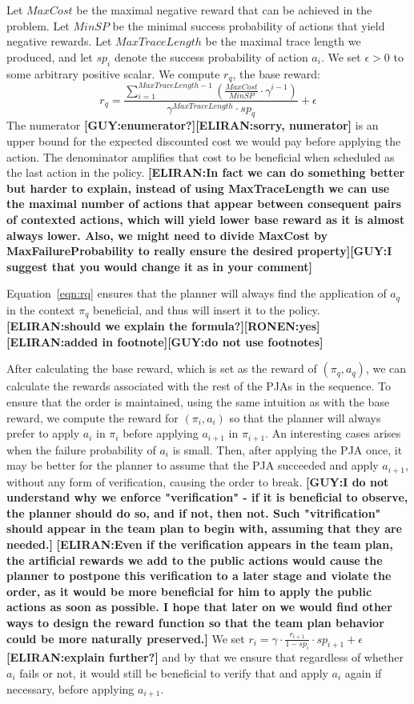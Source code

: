 \documentclass[letterpaper]{article} %
\newcommand{\eliran}[1]{\textbf{[\color{red}ELIRAN:#1]}}
\newcommand{\ronen}[1]{\textbf{[\color{blue}RONEN:#1]}}
\newcommand{\guy}[1]{\textbf{[\color{orange}GUY:#1]}}
\begin{document}
Let $MaxCost$ be the maximal negative reward that can be achieved in the problem. Let $MinSP$ be the minimal success probability of actions that yield negative rewards. Let $MaxTraceLength$ be the maximal trace length we produced, and let $sp_i$ denote the success probability of action $a_i$. We set $\epsilon > 0$ to some arbitrary positive scalar. We compute $r_q$, the base reward:
\begin{equation}
\label{eqn:rq}
   r_q = \frac{\sum_{i=1}^{MaxTraceLength-1}(\frac{MaxCost}{MinSP} \cdot \gamma^{i-1})}{\gamma^{MaxTraceLength}\cdot sp_q} + \epsilon
\end{equation}%
The numerator \guy{enumerator?}\eliran{sorry, numerator} is an upper bound for the expected discounted cost we would pay before applying the action. The denominator amplifies that cost to be beneficial when scheduled as the last action in the policy.
\eliran{In fact we can do something better but harder to explain, instead of using MaxTraceLength we can use the maximal number of actions that appear between consequent pairs of contexted actions, which will yield lower base reward as it is almost always lower. Also, we might need to divide MaxCost by MaxFailureProbability to really ensure the desired property}\guy{I suggest that you would change it as in your comment}

Equation~\ref{eqn:rq} ensures that the planner will always find the application of $a_q$ in the context $\pi_q$ beneficial, and thus will insert it to the policy. \eliran{should we explain the formula?}\ronen{yes}
\eliran{added in footnote}\guy{do not use footnotes}

After calculating the base reward, which is set as the reward of $(\pi_q, a_q)$, we can calculate the rewards associated with the rest of the PJAs in the sequence. To ensure that the order is maintained, using the same intuition as with the base reward, we compute the reward for $(\pi_i, a_i)$ so that the planner will always prefer to apply $a_i$ in $\pi_i$ before applying $a_{i+1}$ in $\pi_{i+1}$. 
An interesting cases arises when the failure probability of $a_i$ is small. Then, after applying the PJA once, it may be better for the planner to assume that the PJA succeeded and apply $a_{i+1}$, without any form of verification, causing the order to break.
\guy{I do not understand why we enforce "verification" - if it is beneficial to observe, the planner should do so, and if not, then not. Such "vitrification" should appear in the team plan to begin with, assuming that they are needed.}
\eliran{Even if the verification appears in the team plan, the artificial rewards we add to the public actions would cause the planner to postpone this verification to a later stage and violate the order, as it would be more beneficial for him to apply the public actions as soon as possible. I hope that later on we would find other ways to design the reward function so that the team plan behavior could be more naturally preserved.}
We set $r_i=\gamma \cdot \frac{r_{i+1}}{1-sp_i} \cdot sp_{i+1} + \epsilon$ \eliran{explain further?}
and by that we ensure that regardless of whether $a_i$ fails or not, it would still be beneficial to verify that and apply $a_i$ again if necessary, before applying $a_{i+1}$.
\end{document}

